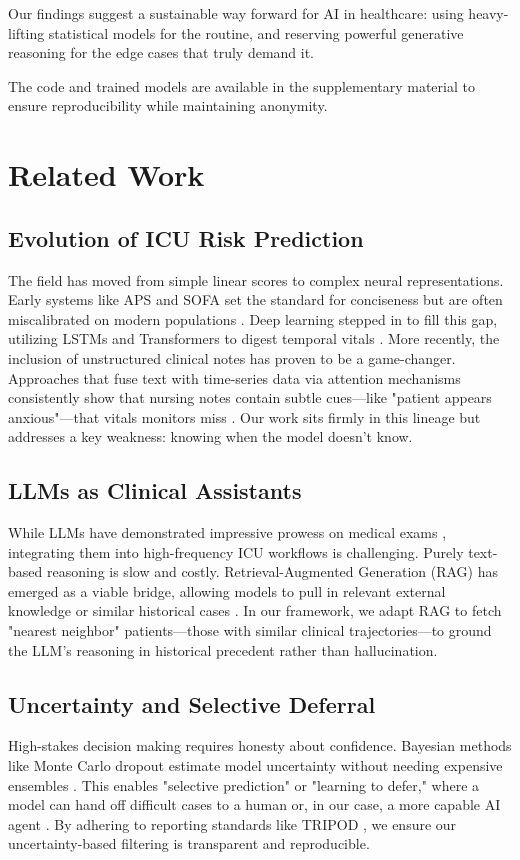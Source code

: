 \documentclass{article}
\begin{document}
Our findings suggest a sustainable way forward for AI in healthcare: using heavy-lifting statistical models for the routine, and reserving powerful generative reasoning for the edge cases that truly demand it.

The code and trained models are available in the supplementary material to ensure reproducibility while maintaining anonymity.

\section{Related Work}

\subsection{Evolution of ICU Risk Prediction}
The field has moved from simple linear scores to complex neural representations. Early systems like APS and SOFA \cite{Vincent1996SOFA,Knaus1991APACHEIII} set the standard for conciseness but are often miscalibrated on modern populations \cite{Zimmerman2006APACHE4}. Deep learning stepped in to fill this gap, utilizing LSTMs and Transformers to digest temporal vitals \cite{OzrazgatBaslanti2021AIICU}. More recently, the inclusion of unstructured clinical notes has proven to be a game-changer. Approaches that fuse text with time-series data via attention mechanisms consistently show that nursing notes contain subtle cues—like "patient appears anxious"—that vitals monitors miss \cite{Lyu2023MultimodalTransformer,King2023MultimodalPretrain}. Our work sits firmly in this lineage but addresses a key weakness: knowing when the model doesn't know.

\subsection{LLMs as Clinical Assistants}
While LLMs have demonstrated impressive prowess on medical exams \cite{Singhal2023MedPaLM}, integrating them into high-frequency ICU workflows is challenging. Purely text-based reasoning is slow and costly. Retrieval-Augmented Generation (RAG) has emerged as a viable bridge, allowing models to pull in relevant external knowledge or similar historical cases \cite{Lewis2020RAG}. In our framework, we adapt RAG to fetch "nearest neighbor" patients—those with similar clinical trajectories—to ground the LLM's reasoning in historical precedent rather than hallucination.

\subsection{Uncertainty and Selective Deferral}
High-stakes decision making requires honesty about confidence. Bayesian methods like Monte Carlo dropout estimate model uncertainty without needing expensive ensembles \cite{Gal2016DropoutUncertainty}. This enables "selective prediction" or "learning to defer," where a model can hand off difficult cases to a human or, in our case, a more capable AI agent \cite{Geifman2017SelectiveClassification}. By adhering to reporting standards like TRIPOD \cite{Moons2015TRIPOD}, we ensure our uncertainty-based filtering is transparent and reproducible.
\end{document}
